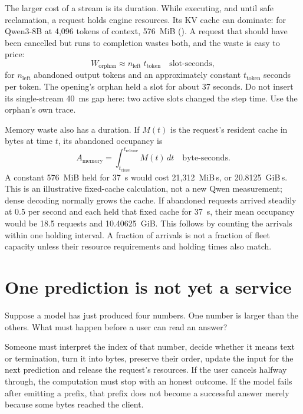 The larger cost of a stream is its duration. While executing, and until safe
reclamation, a request holds engine resources. Its KV cache can dominate:
for Qwen3-8B at 4,096
tokens of context, 576~MiB (). A request that should have been
cancelled but runs to completion wastes both, and the waste is easy to price:
\begin{equation}
W_{\text{orphan}} \approx n_{\text{left}}\;t_{\text{token}}
   \quad\text{slot-seconds},
\label{eq:orphan-waste}
\end{equation}
for $n_{\text{left}}$ abandoned output tokens and an approximately constant
$t_{\text{token}}$ seconds per token. The opening's orphan held a slot for
about 37 seconds. Do not insert its single-stream 40~ms gap here: two active
slots changed the step time. Use the orphan's own trace.

Memory waste also has a duration. If $M(t)$ is the request's resident cache
in bytes at time $t$, its abandoned occupancy is
\begin{equation}
A_{\mathrm{memory}}=\int_{t_{\mathrm{close}}}^{t_{\mathrm{release}}} M(t)\,dt
   \quad\text{byte-seconds}.
\end{equation}
A constant 576~MiB held for 37~s would cost 21,312~MiB\,s, or
20.8125~GiB\,s. This is an illustrative fixed-cache calculation, not a new
Qwen measurement; dense decoding normally grows the cache. If abandoned
requests arrived steadily at 0.5 per second and each held that fixed cache
for 37~s, their mean occupancy would be 18.5 requests and 10.40625~GiB.
This follows by counting the arrivals within one holding interval. A
fraction of arrivals is not a fraction of fleet capacity unless their
resource requirements and holding times also match.

\section{One prediction is not yet a service}
Suppose a model has just produced four numbers. One number is larger than the
others. What must happen before a user can read an answer?

Someone must interpret the index of that number, decide whether it means text
or termination, turn it into bytes, preserve their order, update the input for
the next prediction and release the request's resources. If the user cancels
halfway through, the computation must stop with an honest outcome. If the model
fails after emitting a prefix, that prefix does not become a successful answer
merely because some bytes reached the client.

